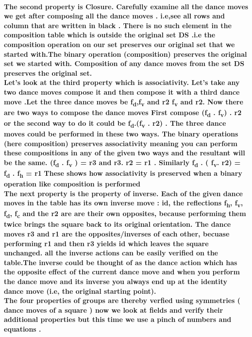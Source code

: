 \documentclass{article}
\begin{document}
\\
\textbf{The second property is Closure. Carefully examine all the dance moves we get after composing all the dance moves . i.e,see all rows and column that are written in black . There is no such element in the composition table  which is outside the original set DS .i.e the composition operation on our set preserves our original set that we started with.The binary operation (composition) 
    preserves the original set we started with. Composition of any dance moves from the set DS preserves the original set.
}
\\
\textbf{Let's look at the third property which is associativity. Let's take any two dance moves compose it and then compose it with a third dance move .Let the three dance moves be f\textsubscript{d},f\textsubscript{v} and r2 f\textsubscript{v} and r2. Now there are two ways to compose the dance moves 
First compose (f\textsubscript{d} . f\textsubscript{v}) . r2  or the second way to do it could be f\textsubscript{d}.(f\textsubscript{v} . r2) . The three dance moves could be performed in these two ways. The binary operations (here composition) preserves associativity meaning you can perform these compositions in any of the given two ways and the resultant will be the same. 
(f\textsubscript{d} . f\textsubscript{v} )  = r3  and r3. r2 = r1 . Similarly 
f\textsubscript{d} . ( f\textsubscript{v}. r2) = f\textsubscript{d} . f\textsubscript{h} = r1 }
\textbf{These shows how associativity is  preserved when a binary operation like composition is performed}
\\
\textbf{The next property is the property of inverse. Each of the given dance moves in the table has its own inverse move : id, the reflections f\textsubscript{h}, f\textsubscript{v}, f\textsubscript{d}, f\textsubscript{c} and the r2 are are their own opposites, because performing them twice brings the square back to its original orientation. The dance moves r3 and r1 are the opposites/inverses of each other, becuase performing r1 and then r3 yields id which leaves the square unchanged.
all the inverse actions can be easily verified on the table.The inverse could be thought of as the dance action which has the opposite effect of the current dance move and when you perform the dance move and its inverse you always end up at the identity dance move (i.e, the original starting point).}
\\
\textbf{The four properties of groups are thereby verfied using symmetries ( dance moves of a square ) now we look at fields and verify their additional properties but this time we use a pinch of numbers and equations . }
\pagebreak 
\end{document}
